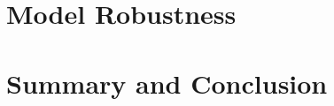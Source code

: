 \documentclass[12pt,a4paper]{report}
\begin{document}
	{
		\FloatBarrier
		\chapter{Model Robustness}
		\label{chp:modelRobustness}
		
	}

    {
        \FloatBarrier
        \chapter{Summary and Conclusion}
        \label{chp:summaryAndConclusion}
        
    }

	{
		\FloatBarrier
		\newpage
		\printbibliography[title = References]
	}
\end{document}
